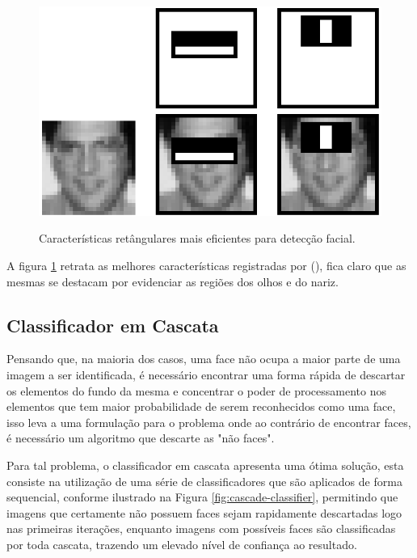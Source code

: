 \begin{figure}[htb]
    \centering
    \caption{Características retângulares mais eficientes para detecção facial.}
    \includegraphics[scale=.4]{figs/top-features.png}
    \label{fig:top-features}
 \end{figure}

 A figura \ref{fig:top-features} retrata as melhores características registradas por  (\citeyear{paper-viola-jones}), fica claro que as mesmas se destacam por evidenciar as regiões dos olhos e do nariz.

\subsection{Classificador em Cascata}

Pensando que, na maioria dos casos, uma face não ocupa a maior parte de uma imagem a ser identificada, é necessário encontrar uma forma rápida de descartar os elementos do fundo da mesma e concentrar o poder de processamento nos elementos que tem maior probabilidade de serem reconhecidos como uma face, isso leva a uma formulação para o problema onde ao contrário de encontrar faces, é necessário um algoritmo que descarte as "não faces".

Para tal problema, o classificador em cascata apresenta uma ótima solução, esta consiste na utilização de uma série de classificadores que são aplicados de forma sequencial, conforme ilustrado na Figura \ref{fig:cascade-classifier}, permitindo que imagens que certamente não possuem faces sejam rapidamente descartadas logo nas primeiras iterações, enquanto imagens com possíveis faces são classificadas por toda cascata, trazendo um elevado nível de confiança ao resultado.

